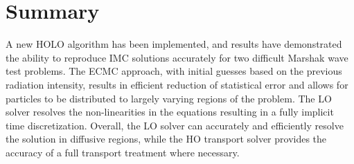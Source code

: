 \documentclass[11pt]{article}
\begin{document}





%

\section{Summary}

A new HOLO algorithm has been implemented, and results have demonstrated the ability
to reproduce IMC solutions accurately for two difficult Marshak
wave test problems.  The ECMC approach, with initial guesses based on the
previous radiation intensity, results in efficient reduction of statistical error and
allows for particles to be distributed to largely varying regions of the problem.
The LO solver resolves the non-linearities in the equations resulting in a fully
implicit time discretization. Overall, the LO solver 
can accurately and efficiently resolve the solution in diffusive regions, while the HO
transport solver provides the accuracy of a full transport treatment where necessary. 
\end{document}
